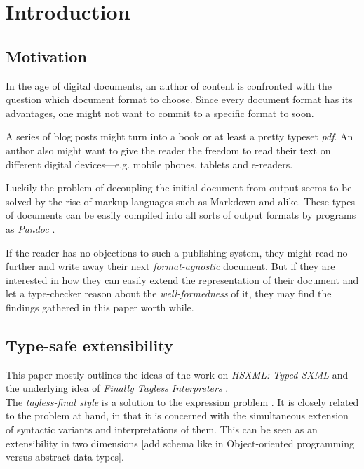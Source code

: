 \clearpage

\section{Introduction}

\subsection{Motivation}

In the age of digital documents, an author of content is confronted with the
question which document format to choose. Since every document format has its
advantages, one might not want to commit to a specific format to soon.

A series of blog posts might turn into a book or at least a pretty typeset
\emph{pdf}. An author also might want to give the reader the freedom to read
their text on different digital devices—e.g. mobile phones, tablets and e-readers.

Luckily the problem of decoupling the initial document from output seems to be
solved by the rise of markup languages such as Markdown and alike. These types
of documents can be easily compiled into all sorts of output formats by programs
as \emph{Pandoc} \cite{pandoc}.

If the reader has no objections to such a publishing system, they might read no
further and write away their next \emph{format-agnostic} document. But if they
are interested in how they can easily extend the representation of their
document and let a type-checker reason about the \emph{well-formedness} of it,
they may find the findings gathered in this paper worth while.

\subsection{Type-safe extensibility}

This paper mostly outlines the ideas of the work on \emph{HSXML: Typed SXML}
\cite{hsxml} and the underlying idea of \emph{Finally Tagless Interpreters}
\cite{finally-tagless, finally-tagless-tut}.\\
The \emph{tagless-final style} is a solution to the expression problem
\cite{expression-problem}. It is closely related to the problem at hand, in that
it is concerned with the simultaneous extension of syntactic variants and
interpretations of them. This can be seen as an extensibility in two dimensions
[add schema like in Object-oriented programming versus abstract data types].

